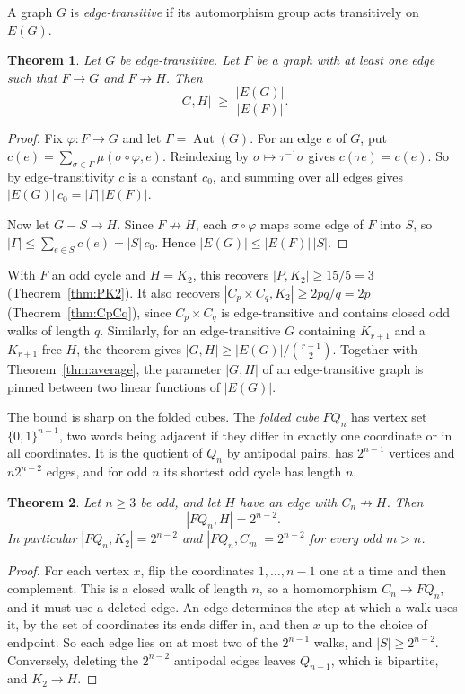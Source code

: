 \documentclass{article}
\newtheorem{theorem}{Theorem}[section]
\theoremstyle{definition}
\begin{document}
A graph $G$ is \emph{edge-transitive} if its automorphism group acts
transitively on $E(G)$.

\begin{theorem}
\label{thm:edge_transitive}
Let $G$ be edge-transitive.  Let $F$ be a graph with at least one edge such that
$F\to G$ and $F\not\to H$.  Then
\[
  |G,H|\;\ge\;\frac{|E(G)|}{|E(F)|}.
\]
\end{theorem}

\begin{proof}
Fix $\varphi\colon F\to G$ and let $\Gamma=\operatorname{Aut}(G)$.  For an edge $e$
of $G$, put $c(e)=\sum_{\sigma\in\Gamma}\mu(\sigma\circ\varphi,e)$.  Reindexing
by $\sigma\mapsto\tau^{-1}\sigma$ gives $c(\tau e)=c(e)$.  So by
edge-transitivity $c$ is a constant $c_0$, and summing over all edges gives
$|E(G)|\,c_0=|\Gamma|\,|E(F)|$.

Now let $G-S\to H$.  Since $F\not\to H$, each $\sigma\circ\varphi$ maps some edge
of $F$ into $S$, so $|\Gamma|\le\sum_{e\in S}c(e)=|S|\,c_0$.  Hence
$|E(G)|\le|E(F)|\,|S|$.
\end{proof}

With $F$ an odd cycle and $H=K_2$, this recovers $|P,K_2|\ge15/5=3$
(Theorem~\ref{thm:PK2}).  It also recovers $|C_p\times C_q,K_2|\ge2pq/q=2p$
(Theorem~\ref{thm:CpCq}), since $C_p\times C_q$ is edge-transitive and contains
closed odd walks of length $q$.  Similarly, for an edge-transitive $G$ containing
$K_{r+1}$ and a $K_{r+1}$-free $H$, the theorem gives
$|G,H|\ge|E(G)|/\binom{r+1}2$.  Together with Theorem~\ref{thm:average}, the
parameter $|G,H|$ of an edge-transitive graph is pinned between two linear
functions of $|E(G)|$.

The bound is sharp on the folded cubes.  The \emph{folded cube} $FQ_n$ has vertex
set $\{0,1\}^{n-1}$, two words being adjacent if they differ in exactly one
coordinate or in all coordinates.  It is the quotient of $Q_n$ by antipodal
pairs, has $2^{n-1}$ vertices and $n2^{n-2}$ edges, and for odd $n$ its shortest
odd cycle has length $n$.

\begin{theorem}
\label{thm:folded}
Let $n\ge3$ be odd, and let $H$ have an edge with $C_n\not\to H$.  Then
\[
  |FQ_n,H| = 2^{n-2}.
\]
In particular $|FQ_n,K_2|=2^{n-2}$ and $|FQ_n,C_m|=2^{n-2}$ for every odd $m>n$.
\end{theorem}

\begin{proof}
For each vertex $x$, flip the coordinates $1,\dots,n-1$ one at a time and then
complement.  This is a closed walk of length $n$, so a homomorphism
$C_n\to FQ_n$, and it must use a deleted edge.  An edge determines the step at
which a walk uses it, by the set of coordinates its ends differ in, and then $x$
up to the choice of endpoint.  So each edge lies on at most two of the $2^{n-1}$
walks, and $|S|\ge2^{n-2}$.  Conversely, deleting the $2^{n-2}$ antipodal edges
leaves $Q_{n-1}$, which is bipartite, and $K_2\to H$.
\end{proof}
\end{document}
